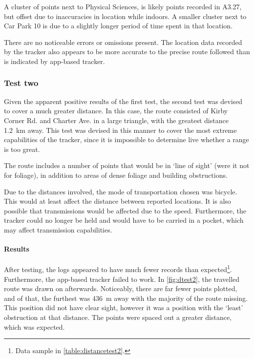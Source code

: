 A cluster of points next
to Physical Sciences, is likely points recorded in A3.27, but offset due to inaccuracies
in location while indoors. A smaller cluster next to Car Park 10 is due to a slightly longer
period of time spent in that location.

There are no noticeable errors or omissions present. The location data recorded by the
tracker also appears to be more accurate to the precise route followed than is indicated by
app-based tracker.

\subsubsection{Test two}
Given the apparent positive results of the first test, the second test 
was devised to cover a much greater distance. In this case, the route consisted 
of Kirby Corner Rd. and Charter Ave. in a large triangle, with the greatest distance 
\qty{1.2}{\km} away. This test was devised in this manner to cover the most extreme 
capabilities of the tracker, since it is impossible to determine live whether a 
range is too great. 

The route includes a number of points that would be in `line of sight' (were it not for foliage),
in addition to areas of dense foliage and building obstructions. 

Due to the distances involved, the mode of transportation chosen was bicycle. This would 
at least affect the distance between reported locations. It is also possible that 
transmissions would be affected due to the speed. Furthermore, the tracker could no longer
be held and would have to be carried in a pocket, which may affect transmission capabilities. 

\paragraph{Results}
After testing, the logs appeared to have much fewer records than expected\footnote{
    Data sample in \cref{table:distancetest2}.
}. Furthermore, the 
app-based tracker failed to work. In \cref{fig:dtest2}, the travelled route was drawn on afterwards.
Noticeably, there are far fewer points plotted, and of that, the furthest was \qty{436}{\m} away with 
the majority of the route missing. 
This position did not have clear sight, however it was a position with the `least' obstruction
at that distance. The points were spaced out a greater distance,  which was expected. 


